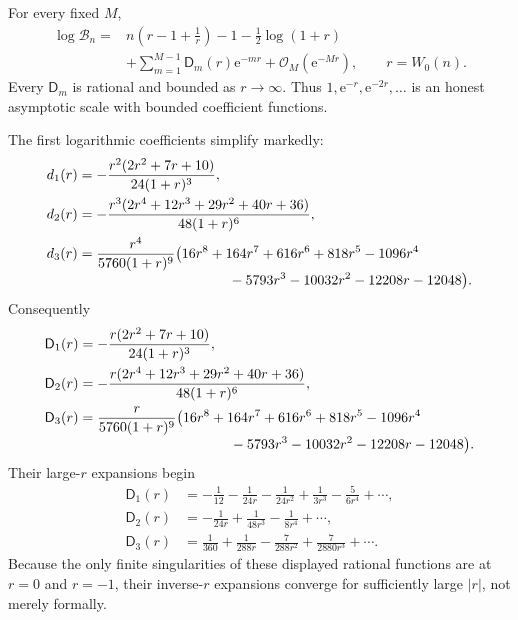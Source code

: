 \documentclass[11pt,a4paper]{article}
\theoremstyle{definition}
\theoremstyle{remark}
\newcommand{\Bell}{\mathcal B}
\newcommand{\ee}{\mathrm e}
\newcommand{\BigO}{\mathcal O}
\newcommand{\cD}{\mathsf D}
\begin{document}
\begin{transbox}
For every fixed \(M\),
\begin{equation}\label{eq:log-e-r-transseries}
 \boxed{
 \begin{aligned}
 \log\Bell_n={}&n\left(r-1+\frac1r\right)-1-\frac12\log(1+r)\\
 &+\sum_{m=1}^{M-1}\cD_m(r)\ee^{-mr}
 +\BigO_M(\ee^{-Mr}),
 \qquad r=W_0(n).
 \end{aligned}}
\end{equation}
Every \(\cD_m\) is rational and bounded as \(r\to\infty\).  Thus
\(1,\ee^{-r},\ee^{-2r},\ldots\) is an honest asymptotic scale with bounded
coefficient functions.
\end{transbox}

The first logarithmic coefficients simplify markedly:
\begin{align}
 d_1(r)
 &=-\frac{r^2(2r^2+7r+10)}{24(1+r)^3},
 \label{eq:d1}\\
 d_2(r)
 &=-\frac{r^3(2r^4+12r^3+29r^2+40r+36)}{48(1+r)^6},
 \label{eq:d2}\\
 d_3(r)
 &=\frac{r^4}{5760(1+r)^9}
 \bigl(16r^8+164r^7+616r^6+818r^5-1096r^4
 \notag\\[-1mm]
 &\hspace{38mm}{}-5793r^3-10032r^2-12208r-12048\bigr).
 \label{eq:d3}
\end{align}
Consequently
\begin{align}
 \cD_1(r)
 &=-\frac{r(2r^2+7r+10)}{24(1+r)^3},
 \label{eq:D1}\\
 \cD_2(r)
 &=-\frac{r(2r^4+12r^3+29r^2+40r+36)}{48(1+r)^6},
 \label{eq:D2}\\
 \cD_3(r)
 &=\frac{r}{5760(1+r)^9}
 \bigl(16r^8+164r^7+616r^6+818r^5-1096r^4
 \notag\\[-1mm]
 &\hspace{38mm}{}-5793r^3-10032r^2-12208r-12048\bigr).
 \label{eq:D3}
\end{align}
Their large-\(r\) expansions begin
\begin{align}
 \cD_1(r)&=-\frac1{12}-\frac1{24r}-\frac1{24r^2}
             +\frac1{3r^3}-\frac5{6r^4}+\cdots,
 \label{eq:D1-invr}\\
 \cD_2(r)&=-\frac1{24r}+\frac1{48r^3}-\frac1{8r^4}+\cdots,
 \label{eq:D2-invr}\\
 \cD_3(r)&=\frac1{360}+\frac1{288r}-\frac7{288r^2}
             +\frac7{2880r^3}+\cdots.
 \label{eq:D3-invr}
\end{align}
Because the only finite singularities of these displayed rational functions are
at \(r=0\) and \(r=-1\), their inverse-\(r\) expansions converge for
sufficiently large \(|r|\), not merely formally.
\end{document}
